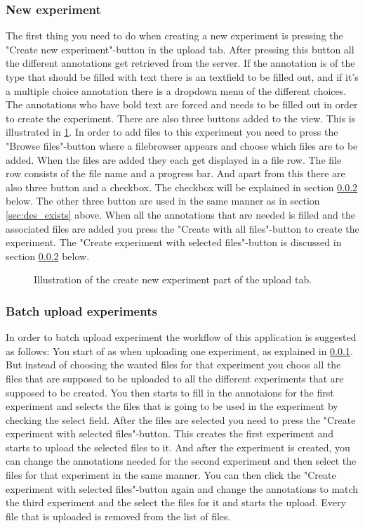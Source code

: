 \subsubsection{New experiment}
\label{sec:des_create}
The first thing you need to do when creating a new experiment is pressing the "Create new experiment"-button in the upload tab. After pressing this button all the different annotations get retrieved from the server. If the annotation is of the type that should be filled with text there is an textfield to be filled out, and if it's a multiple choice annotation there is a dropdown menu of the different choices. The annotations who have bold text are forced and needs to be filled out in order to create the experiment. There are also three buttons added to the view. This is illustrated in \ref{fig:des_upload-new}. In order to add files to this experiment you need to press the "Browse files"-button where a filebrowser appears and choose which files are to be added. When the files are added they each get displayed in a file row. The file row consists of the file name and a progress bar. And apart from this there are also three button and a checkbox. The checkbox will be explained in section \ref{sec:des_batch} below. The other three button are used in the same manner as in section \ref{sec:des_exists} above. When all the annotations that are needed is filled and the associated files are added you press the "Create with all files"-button to create the experiment. The "Create experiment with selected files"-button is discussed in section \ref{sec:des_batch} below.
\\
\begin{figure}[h]
	\caption{Illustration of the create new experiment part of the upload tab.}
	\label{fig:des_upload-new}
\end{figure}
\subsubsection{Batch upload experiments}
\label{sec:des_batch}
In order to batch upload experiment the workflow of this application is suggested as follows:
You start of as when uploading one experiment, as explained in \ref{sec:des_create}. But instead of choosing the wanted files for that experiment you choos all the files that are supposed to be uploaded to all the different experiments that are supposed to be created. You then starts to fill in the annotaions for the first experiment and selects the files that is going to be used in the experiment by checking the select field. After the files are selected you need to press the "Create experiment with selected files"-button. This creates the first experiment and starts to upload the selected files to it. And after the experiment is created, you can change the annotations  needed for the second experiment and then select the files for that experiment in the same manner. You can then click the "Create experiment with selected files"-button again and change the annotations to match the third experiment and the select the files for it and starts the upload. Every file that is uploaded is removed from the list of files. 

